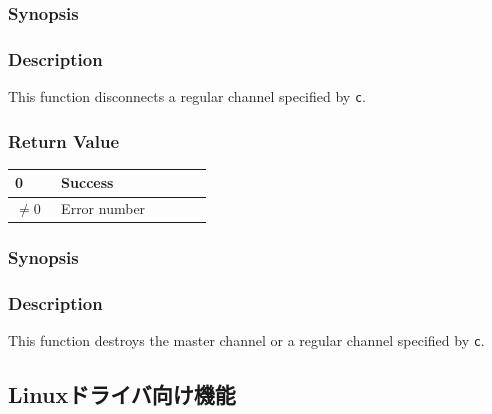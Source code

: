 \documentclass[twoside,11pt,fleqn]{book}
\begin{document}
\subsubsection{}
\subsubsection*{Synopsis}{\quad}
\subsubsection*{Description}{\quad}
This function disconnects a regular channel specified by \texttt{c}.

\subsubsection*{Return Value}{\quad}
\begin{table}[!h]
\footnotesize
\begin{tabular}{|p{0.20\linewidth}|p{0.66\linewidth}|} \hline
0&Success\\ \hline
$\ne 0$&Error number\\ \hline
\end{tabular}
\vspace{-0em}
\end{table}
\FloatBarrier

% 

\subsubsection{}
\subsubsection*{Synopsis}{\quad}
\subsubsection*{Description}{\quad}
This function destroys the master channel or a regular channel specified by \texttt{c}.

\subsection{Linuxドライバ向け機能}
\end{document}
